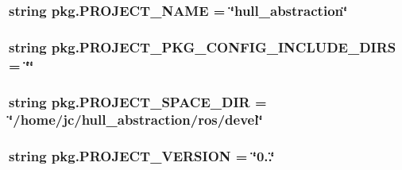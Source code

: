 \subsubsection[{\texorpdfstring{P\+R\+O\+J\+E\+C\+T\+\_\+\+N\+A\+ME}{PROJECT_NAME}}]{\setlength{\rightskip}{0pt plus 5cm}string pkg.\+P\+R\+O\+J\+E\+C\+T\+\_\+\+N\+A\+ME = \char`\"{}hull\+\_\+abstraction\char`\"{}}\hypertarget{namespacepkg_a7dfbe99257c26f5e4a3a5483995d9ddc}{}\label{namespacepkg_a7dfbe99257c26f5e4a3a5483995d9ddc}
\subsubsection[{\texorpdfstring{P\+R\+O\+J\+E\+C\+T\+\_\+\+P\+K\+G\+\_\+\+C\+O\+N\+F\+I\+G\+\_\+\+I\+N\+C\+L\+U\+D\+E\+\_\+\+D\+I\+RS}{PROJECT_PKG_CONFIG_INCLUDE_DIRS}}]{\setlength{\rightskip}{0pt plus 5cm}string pkg.\+P\+R\+O\+J\+E\+C\+T\+\_\+\+P\+K\+G\+\_\+\+C\+O\+N\+F\+I\+G\+\_\+\+I\+N\+C\+L\+U\+D\+E\+\_\+\+D\+I\+RS = \char`\"{}\char`\"{}}\hypertarget{namespacepkg_a2760bf8266ff58da440f65ee91b203ab}{}\label{namespacepkg_a2760bf8266ff58da440f65ee91b203ab}
\subsubsection[{\texorpdfstring{P\+R\+O\+J\+E\+C\+T\+\_\+\+S\+P\+A\+C\+E\+\_\+\+D\+IR}{PROJECT_SPACE_DIR}}]{\setlength{\rightskip}{0pt plus 5cm}string pkg.\+P\+R\+O\+J\+E\+C\+T\+\_\+\+S\+P\+A\+C\+E\+\_\+\+D\+IR = \char`\"{}/home/jc/hull\+\_\+abstraction/ros/devel\char`\"{}}\hypertarget{namespacepkg_a3f0f1b4bc03c596525e025539ca4332f}{}\label{namespacepkg_a3f0f1b4bc03c596525e025539ca4332f}
\subsubsection[{\texorpdfstring{P\+R\+O\+J\+E\+C\+T\+\_\+\+V\+E\+R\+S\+I\+ON}{PROJECT_VERSION}}]{\setlength{\rightskip}{0pt plus 5cm}string pkg.\+P\+R\+O\+J\+E\+C\+T\+\_\+\+V\+E\+R\+S\+I\+ON = \char`\"{}0..\char`\"{}}\hypertarget{namespacepkg_ab1037914b9286bb61855131c06149648}{}\label{namespacepkg_ab1037914b9286bb61855131c06149648}
